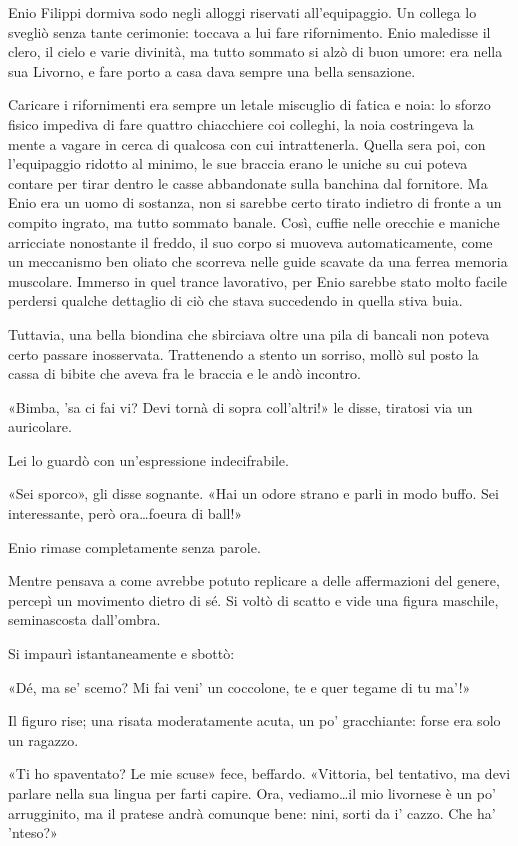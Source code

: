 Enio Filippi dormiva sodo negli alloggi riservati all'equipaggio. Un collega lo svegliò senza tante cerimonie: toccava a lui fare rifornimento. Enio maledisse il clero, il cielo e varie divinità, ma tutto sommato si alzò di buon umore: era nella sua Livorno, e fare porto a casa dava sempre una bella sensazione.

Caricare i rifornimenti era sempre un letale miscuglio di fatica e noia: lo sforzo fisico impediva di fare quattro chiacchiere coi colleghi, la noia costringeva la mente a vagare in cerca di qualcosa con cui intrattenerla. Quella sera poi, con l'equipaggio ridotto al minimo, le sue braccia erano le uniche su cui poteva contare per tirar dentro le casse abbandonate sulla banchina dal fornitore. Ma Enio era un uomo di sostanza, non si sarebbe certo tirato indietro di fronte a un compito ingrato, ma tutto sommato banale. Così, cuffie nelle orecchie e maniche arricciate nonostante il freddo, il suo corpo si muoveva automaticamente, come un meccanismo ben oliato che scorreva nelle guide scavate da una ferrea memoria muscolare. Immerso in quel trance lavorativo, per Enio sarebbe stato molto facile perdersi qualche dettaglio di ciò che stava succedendo in quella stiva buia.

Tuttavia, una bella biondina che sbirciava oltre una pila di bancali non poteva certo passare inosservata. Trattenendo a stento un sorriso, mollò sul posto la cassa di bibite che aveva fra le braccia e le andò incontro.

«Bimba, 'sa ci fai vi? Devi tornà di sopra coll'altri!» le disse, tiratosi via un auricolare.

Lei lo guardò con un'espressione indecifrabile.

«Sei sporco», gli disse sognante. «Hai un odore strano e parli in modo buffo. Sei interessante, però ora\ldots foeura di ball!»

Enio rimase completamente senza parole.

Mentre pensava a come avrebbe potuto replicare a delle affermazioni del genere, percepì un movimento dietro di sé. Si voltò di scatto e vide una figura maschile, seminascosta dall'ombra.

Si impaurì istantaneamente e sbottò:

«Dé, ma se' scemo? Mi fai veni' un coccolone, te e quer tegame di tu ma'!»

Il figuro rise; una risata moderatamente acuta, un po' gracchiante: forse era solo un ragazzo.

«Ti ho spaventato? Le mie scuse» fece, beffardo. «Vittoria, bel tentativo, ma devi parlare nella sua lingua per farti capire. Ora, vediamo\ldots il mio livornese è un po' arrugginito, ma il pratese andrà comunque bene: nini, sorti da i' cazzo. Che ha' 'nteso?»

